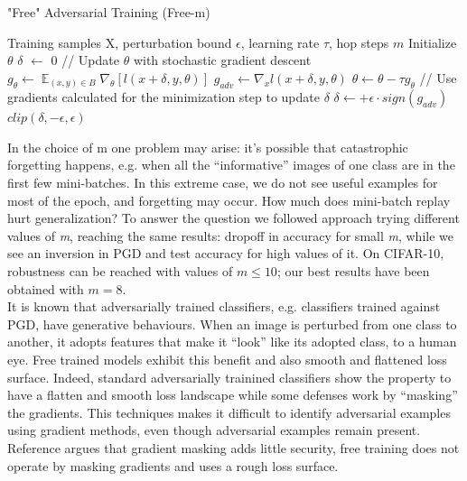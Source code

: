 \documentclass{article}
\DeclareMathOperator{\EX}{\mathbb{E}}%
\begin{document}
\begin{algorithm}[H]
	\caption{"Free" Adversarial Training (Free-m)}
	\begin{algorithmic}[1]
		\Require Training samples X, perturbation bound $\epsilon$, learning rate
		$\tau$, hop steps $m$ \State Initialize $\theta$ \State $\delta$
		$\leftarrow$ 0  
		 \State // Update $\theta$ with stochastic gradient descent
		\State $g_{\theta} \leftarrow \EX_{(x,y) \in B} \nabla_{\theta} [l(x+\delta,
		y, \theta)]$ \State $g_{adv} \leftarrow \nabla_{x} l(x+\delta, y, \theta)$
		\State $\theta \leftarrow \theta - \tau g_{\theta}$ \State // Use gradients
		calculated for the minimization step to update $\delta$ \State $\delta
		\leftarrow + \epsilon \cdot sign(g_{adv})$ \State $clip(\delta, -\epsilon,
		\epsilon)$ \EndFor \EndFor \EndFor
	\end{algorithmic}
\end{algorithm}
In the choice of m one problem may arise: it's possible that catastrophic
forgetting happens, e.g. when all the “informative” images of one class are in
the first few mini-batches. In this extreme case, we do not see useful examples
for most of the epoch, and forgetting may occur. How much does mini-batch replay
hurt generalization? To answer the question we followed \cite{ShafahiEtAl2019b}
approach trying different values of \textit{m}, reaching the same results:
dropoff in accuracy for small \textit{m}, while we see an inversion in PGD and
test accuracy for high values of it. On CIFAR-10, robustness can be reached with
values of $m \leq 10$; our best results have been obtained with $m = 8$.\\
It is known that adversarially trained classifiers, e.g. classifiers trained
against PGD,  have generative behaviours. When an image is perturbed from one
class to another, it adopts features that make it “look” like its adopted class,
to a human eye. Free trained models exhibit this benefit and also smooth and
flattened loss surface. Indeed, standard adversarially trainined classifiers
show the property to have a flatten and smooth loss landscape while some
defenses work by “masking” the gradients. This techniques makes it difficult to
identify adversarial examples using gradient methods, even though adversarial
examples remain present. Reference \cite{EngstromEtAl2018} argues that gradient
masking adds little security, free training does not operate by masking
gradients and uses a rough loss surface.
\end{document}
